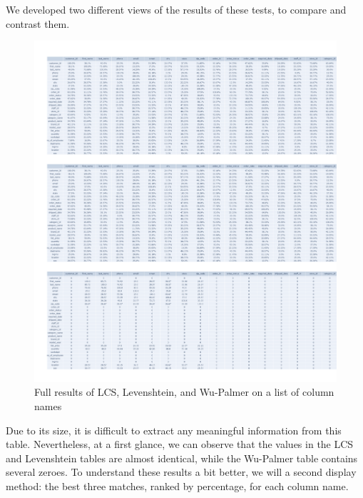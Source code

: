 \bigbreak

We developed two different views of the results of these tests, to compare and contrast them.

\begin{figure}[h]
    \centering
    \includegraphics[width=12cm]{figures/names_lcs_levenshtein_wordnet_table}
    \caption{Full results of LCS, Levenshtein, and Wu-Palmer on a list of column names}\label{fig:figure}
\end{figure}

Due to its size, it is difficult to extract any meaningful information from this table.
Nevertheless, at a first glance, we can observe that the values in the LCS and Levenshtein tables are almost identical,
while the Wu-Palmer table contains several zeroes.
To understand these results a bit better, we will a second display method: the best three matches, ranked by percentage,
for each column name.

